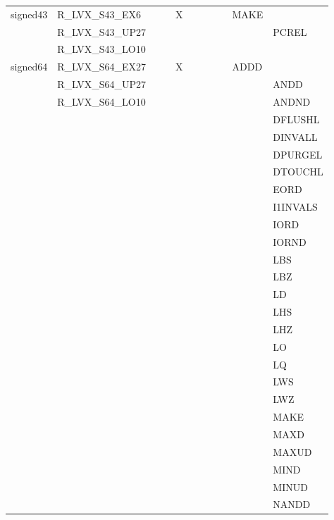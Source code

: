 {\begin{tabular}{|l|l|l|l|l|l|l|l|l|l|l|}
\hline
\textsf{signed43} & \textsf{R\_LVX\_S43\_EX6} & \textsf{} & \textsf{} & \textsf{X} & \textsf{} & \textsf{} & \textsf{} & \textsf{} & \textsf{MAKE} \\
 & \textsf{R\_LVX\_S43\_UP27} & & & & & & & & & \textsf{PCREL} \\
 & \textsf{R\_LVX\_S43\_LO10} & & & & & & & & & \\
\hline
\textsf{signed64} & \textsf{R\_LVX\_S64\_EX27} & \textsf{} & \textsf{} & \textsf{X} & \textsf{} & \textsf{} & \textsf{} & \textsf{} & \textsf{ADDD} \\
 & \textsf{R\_LVX\_S64\_UP27} & & & & & & & & & \textsf{ANDD} \\
 & \textsf{R\_LVX\_S64\_LO10} & & & & & & & & & \textsf{ANDND} \\
 & & & & & & & & & & \textsf{DFLUSHL} \\
 & & & & & & & & & & \textsf{DINVALL} \\
 & & & & & & & & & & \textsf{DPURGEL} \\
 & & & & & & & & & & \textsf{DTOUCHL} \\
 & & & & & & & & & & \textsf{EORD} \\
 & & & & & & & & & & \textsf{I1INVALS} \\
 & & & & & & & & & & \textsf{IORD} \\
 & & & & & & & & & & \textsf{IORND} \\
 & & & & & & & & & & \textsf{LBS} \\
 & & & & & & & & & & \textsf{LBZ} \\
 & & & & & & & & & & \textsf{LD} \\
 & & & & & & & & & & \textsf{LHS} \\
 & & & & & & & & & & \textsf{LHZ} \\
 & & & & & & & & & & \textsf{LO} \\
 & & & & & & & & & & \textsf{LQ} \\
 & & & & & & & & & & \textsf{LWS} \\
 & & & & & & & & & & \textsf{LWZ} \\
 & & & & & & & & & & \textsf{MAKE} \\
 & & & & & & & & & & \textsf{MAXD} \\
 & & & & & & & & & & \textsf{MAXUD} \\
 & & & & & & & & & & \textsf{MIND} \\
 & & & & & & & & & & \textsf{MINUD} \\
 & & & & & & & & & & \textsf{NANDD} \\

\end{tabular}}
